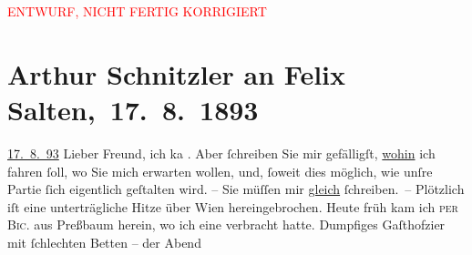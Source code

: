 
\begin{center}
            \textcolor{red}{ENTWURF, NICHT FERTIG KORRIGIERT}
                      \end{center}
            
         
         \renewcommand{\erwaehntePersonen}{Personen: Felix Salten, Josefine Lydia von Weisswasser}
         \renewcommand{\erwaehnteOrte}{Orte: Dölsach, Pressbaum, Wien}
         \renewcommand{\erwaehnteWerke}{}
               \section[ Arthur Schnitzler an Felix Salten, 17. 8. 1893]{ Arthur Schnitzler an Felix Salten, 17. 8. 1893}\nopagebreak{}\rehead{ }\begin{ledgroupsized}[t]{13cm}\normalsize\beginnumbering \toendnotes[C]{\smallbreak\pagebreak[2]} 
\toendnotes[C]{\smallbreak}\pstart
           \raggedleft{}{\pb}\uline{17. 8. 93}\pend
           \pstart{}Lieber Freund,\pend\pstart
           ich ka{\geminationn}{ }\label{K_L02961-1v}\label{K_L02961-1h}. Aber ſchreiben Sie mir gefälligſt, \uline{wohin} ich
               fahren ſoll, wo Sie mich erwarten wollen, {\pb}und, ſoweit dies möglich, wie unſre Partie ſich eigentlich geſtalten wird. –\pend
           \pstart
           Sie müſſen mir \uline{gleich} ſchreiben. –\pend
           \pstart
           Plötzlich iſt eine unterträgliche Hitze über Wien
               hereingebrochen. {\pb}Heute{ }früh kam ich \textsc{per}{ }\textsc{Bic.} aus Preßbaum
               herein, wo ich eine \label{K_L02961-2v}\label{K_L02961-2h} verbracht hatte. Dumpfiges Gaſthofzi{\geminationm}er mit ſchlechten Betten – der Abend

\end{ledgroupsized}
